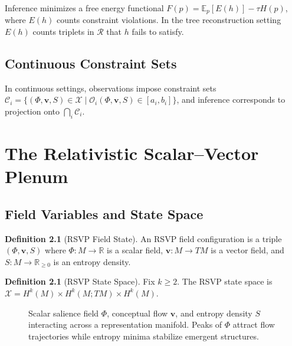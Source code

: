 \documentclass[12pt,a4paper,oneside]{book}
\numberwithin{equation}{chapter}
\theoremstyle{plain}
\theoremstyle{definition}
\newtheorem{definition}[theorem]{Definition}
\theoremstyle{remark}
\begin{document}
Inference minimizes a free energy functional
$F(p) = \mathbb{E}_p[E(h)] - \tau H(p)$,
where $E(h)$ counts constraint violations. In the tree reconstruction
setting $E(h)$ counts triplets in $\mathcal{R}$ that $h$ fails to
satisfy.

\section{Continuous Constraint Sets}

In continuous settings, observations impose constraint sets
$\mathcal{C}_i = \{(\Phi,\mathbf{v},S) \in \mathcal{X} \mid
\mathcal{O}_i(\Phi,\mathbf{v},S) \in [a_i,b_i]\}$, and inference
corresponds to projection onto $\bigcap_i \mathcal{C}_i$.


\chapter{The Relativistic Scalar--Vector Plenum}
\label{ch:rsvp}

\section{Field Variables and State Space}

\begin{definition}[RSVP Field State]
An RSVP field configuration is a triple $(\Phi, \mathbf{v}, S)$
where $\Phi : M \rightarrow \mathbb{R}$ is a scalar field,
$\mathbf{v} : M \rightarrow TM$ is a vector field, and
$S : M \rightarrow \mathbb{R}_{\ge 0}$ is an entropy density.
\end{definition}

\begin{definition}[RSVP State Space]
Fix $k \geq 2$. The RSVP state space is
$\mathcal{X} = H^k(M) \times H^k(M; TM) \times H^k(M)$.
\end{definition}

\begin{figure}[htbp]
\centering
{}
\caption{Scalar salience field $\Phi$, conceptual flow $\mathbf{v}$,
and entropy density $S$ interacting across a representation manifold.
Peaks of $\Phi$ attract flow trajectories while entropy minima
stabilize emergent structures.}
\label{fig:rsvp-geometry}
\end{figure}
\end{document}
